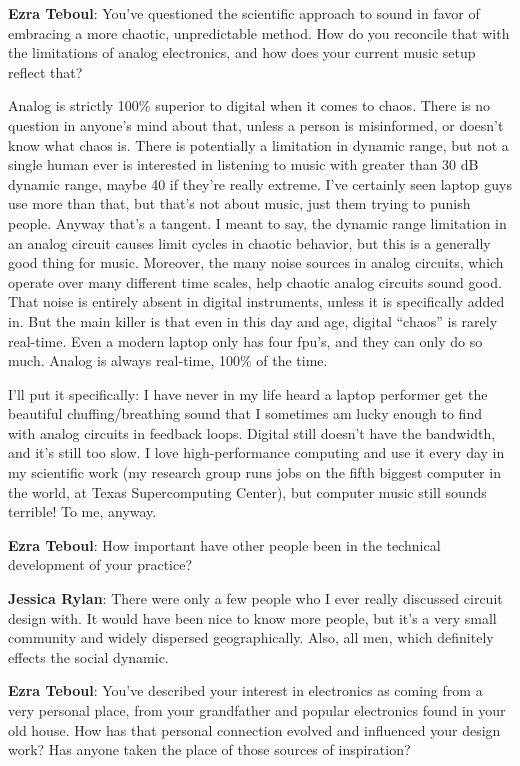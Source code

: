 \textbf{Ezra Teboul}: You've questioned the scientific approach to sound in favor of embracing a more chaotic, unpredictable method. How do you reconcile that with the limitations of analog electronics, and how does your current music setup reflect that? 

Analog is strictly 100\% superior to digital when it comes to chaos. There is no question in anyone's mind about that, unless a person is misinformed, or doesn't know
what chaos is. There is potentially a limitation in dynamic range, but not a single
human ever is interested in listening to music with greater than 30 dB dynamic range,
maybe 40 if they're really extreme. I've certainly seen laptop guys use more than that,
but that's not about music, just them trying to punish people. Anyway that's a tangent. I meant to say, the dynamic range limitation in an analog circuit causes limit cycles
in chaotic behavior, but this is a generally good thing for music. Moreover, the many
noise sources in analog circuits, which operate over many different time scales, help
chaotic analog circuits sound good. That noise is entirely absent in digital
instruments, unless it is specifically added in. But the main killer is that even in
this day and age, digital ``chaos'' is rarely real-time. Even a modern laptop only has
four fpu's, and they can only do so much. Analog is always real-time, 100\% of the time.


I'll put it specifically: I have never in my life heard a laptop performer get the beautiful chuffing/breathing sound that I sometimes am lucky enough to find with analog circuits in feedback loops. Digital still doesn't have the bandwidth, and it's still too slow. I love high-performance computing and use it every day in my scientific work (my research group runs jobs on the fifth biggest computer in the world, at Texas Supercomputing Center), but computer music still sounds terrible! To me, anyway.

\textbf{Ezra Teboul}: How important have other people been in the technical development of your practice? 

                  
\textbf{Jessica Rylan}: There were only a few people who I ever really discussed circuit design with. It would have been nice to know more people, but it's a very small community and widely dispersed geographically. Also, all men, which definitely effects the social dynamic.

\textbf{Ezra Teboul}: You've described your interest in electronics as coming from a very personal place, from your grandfather and popular electronics found in your old house. How has that personal connection evolved and influenced your design work? Has anyone taken the place of those sources of inspiration? 

